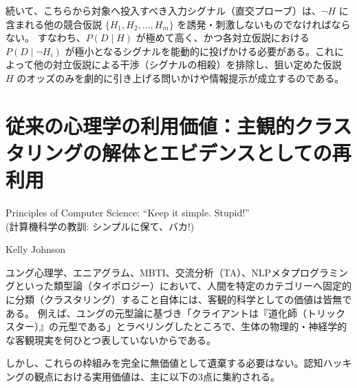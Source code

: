 続いて、こちらから対象へ投入すべき入力シグナル（直交プローブ）は、$\neg H$ に含まれる他の競合仮説 $\{H_1, H_2, \dots, H_m\}$ を誘発・刺激しないものでなければならない。
すなわち、$P(D \mid H)$ が極めて高く、かつ各対立仮説における $P(D \mid \neg H_i)$ が極小となるシグナルを能動的に投げかける必要がある。これによって他の対立仮説による干渉（シグナルの相殺）を排除し、狙い定めた仮説 $H$ のオッズのみを劇的に引き上げる問いかけや情報提示が成立するのである。

\section{従来の心理学の利用価値：主観的クラスタリングの解体とエビデンスとしての再利用}
\epigraph{Principles of Computer Science: ``Keep it simple. Stupid!''\\(計算機科学の教訓: シンプルに保て、バカ!)}{Kelly Johnson}

ユング心理学、エニアグラム、MBTI、交流分析（TA）、NLPメタプログラミングといった類型論（タイポロジー）において、人間を特定のカテゴリーへ固定的に分類（クラスタリング）すること自体には、客観的科学としての価値は皆無である。
例えば、ユングの元型論に基づき「クライアントは『道化師（トリックスター）』の元型である」とラベリングしたところで、生体の物理的・神経学的な客観現実を何ひとつ表していないからである。

しかし、これらの枠組みを完全に無価値として遺棄する必要はない。認知ハッキングの観点における実用価値は、主に以下の3点に集約される。

